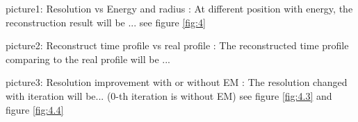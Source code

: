 \documentclass{article}
\begin{document}
\par picture1: Resolution vs Energy and radius : At different position with energy, the reconstruction result will be ... see figure \ref{fig:4}
\par picture2: Reconstruct time profile vs real profile : The reconstructed time profile comparing to the real profile will be ...
\par picture3: Resolution improvement with or without EM : The resolution changed with iteration will be... (0-th iteration is without EM) see figure \ref{fig:4.3} and figure \ref{fig:4.4}
\begin{figure}[htbp]
\centering

%
%



\end{figure}
\end{document}
